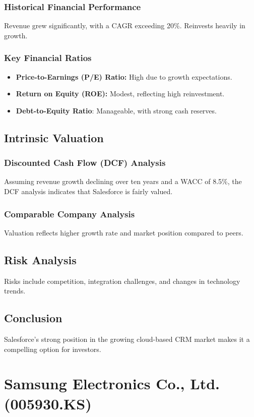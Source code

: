 \documentclass[12pt]{report}
\begin{document}
\subsection{Historical Financial Performance}
Revenue grew significantly, with a CAGR exceeding 20\%. Reinvests heavily in growth.

\subsection{Key Financial Ratios}
\begin{itemize}
    \item \textbf{Price-to-Earnings (P/E) Ratio:} High due to growth expectations.
    \item \textbf{Return on Equity (ROE):} Modest, reflecting high reinvestment.
    \item \textbf{Debt-to-Equity Ratio}: Manageable, with strong cash reserves.
\end{itemize}

\section{Intrinsic Valuation}
\subsection{Discounted Cash Flow (DCF) Analysis}
Assuming revenue growth declining over ten years and a WACC of 8.5\%, the DCF analysis indicates that Salesforce is fairly valued.

\subsection{Comparable Company Analysis}
Valuation reflects higher growth rate and market position compared to peers.

\section{Risk Analysis}
Risks include competition, integration challenges, and changes in technology trends.

\section{Conclusion}
Salesforce's strong position in the growing cloud-based CRM market makes it a compelling option for investors.

\chapter{Samsung Electronics Co., Ltd. (005930.KS)}
\end{document}
